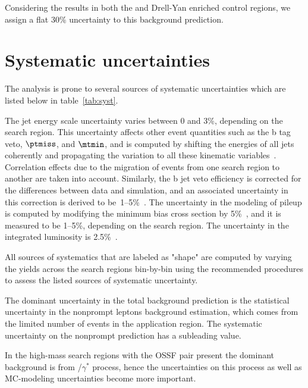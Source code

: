 Considering the results in both the \ttbar and Drell-Yan enriched control regions, we assign a flat 30\% uncertainty to this background prediction. 
\clearpage
\section{Systematic uncertainties}
The analysis is prone to several sources of systematic uncertainties which are listed below in table~\ref{tab:syst}. 

The jet energy scale uncertainty varies between 0 and 3\%, depending on the search region. 
This uncertainty affects other event quantities such as the b tag veto, $\ptmiss$, and $\mtmin$, 
and is computed by shifting the energies of all jets coherently and propagating the variation to all these kinematic variables~\cite{jecDataMC}. 
Correlation effects due to the migration of events from one search region to another are taken into account. 
Similarly, the b jet veto efficiency is corrected for the differences between data and simulation, 
and an associated uncertainty in this correction is derived to be~1--5\%~\cite{btagSF}. 
The uncertainty in the modeling of pileup is computed by modifying the minimum bias cross section by 5\%~\cite{PUtwiki},
and it is measured to be 1--5\%, depending on the search region. 
The uncertainty in the integrated luminosity is 2.5\%~\cite{CMS-PAS-LUM-17-001}.

All sources of systematics that are labeled as "shape" are computed by varying the yields across the search regions 
bin-by-bin using the recommended procedures to assess the listed sources of systematic uncertainty.  

The dominant uncertainty in the total background prediction is the statistical uncertainty in the nonprompt leptons background estimation,
which comes from the limited number of events in the application region. The systematic uncertainty on the nonprompt prediction has
a subleading value. 

In the high-mass search regions with the OSSF pair present the dominant background is from \PW\PZ/\PW$\gamma^*$ process, hence
the uncertainties on this process as well as MC-modeling uncertainties become more important.

